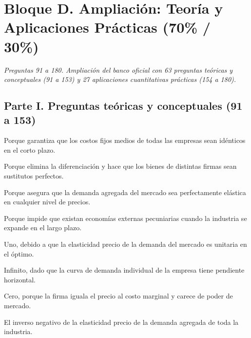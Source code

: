 \section*{Bloque D. Ampliación: Teoría y Aplicaciones Prácticas (70\% / 30\%)}

\noindent\textit{Preguntas 91 a 180. Ampliación del banco oficial con 63 preguntas teóricas y conceptuales (91 a 153) y 27 aplicaciones cuantitativas prácticas (154 a 180).}

\subsection*{Parte I. Preguntas teóricas y conceptuales (91 a 153)}

\begin{opts}
    \item Porque garantiza que los costos fijos medios de todas las empresas sean idénticos en el corto plazo.
    \item Porque elimina la diferenciación y hace que los bienes de distintas firmas sean sustitutos perfectos.
    \item Porque asegura que la demanda agregada del mercado sea perfectamente elástica en cualquier nivel de precios.
    \item Porque impide que existan economías externas pecuniarias cuando la industria se expande en el largo plazo.
\end{opts}

\begin{opts}
    \item Uno, debido a que la elasticidad precio de la demanda del mercado es unitaria en el óptimo.
    \item Infinito, dado que la curva de demanda individual de la empresa tiene pendiente horizontal.
    \item Cero, porque la firma iguala el precio al costo marginal y carece de poder de mercado.
    \item El inverso negativo de la elasticidad precio de la demanda agregada de toda la industria.
\end{opts}

